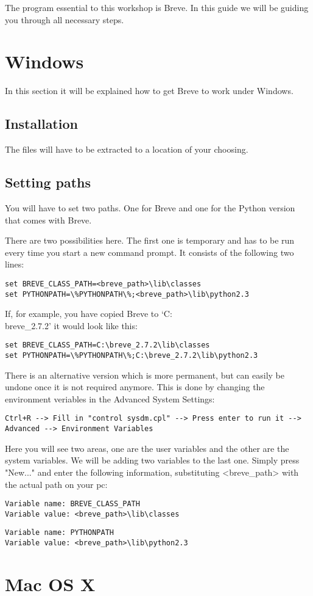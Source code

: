 The program essential to this workshop is Breve. In this guide we will be guiding you through all necessary steps. 

\section{Windows}
In this section it will be explained how to get Breve to work under Windows.
\subsection{Installation}
The files will have to be extracted to a location of your choosing. 

\subsection{Setting paths}
You will have to set two paths. One for Breve and one for the Python version that comes with Breve.

There are two possibilities here. The first one is temporary and has to be run every time you start a new command prompt. It consists of the following two lines:
\begin{lstlisting}
set BREVE_CLASS_PATH=<breve_path>\lib\classes
set PYTHONPATH=\%PYTHONPATH\%;<breve_path>\lib\python2.3
\end{lstlisting}
If, for example, you have copied Breve to `C:\\breve\_2.7.2' it would look like this:
\begin{lstlisting}
set BREVE_CLASS_PATH=C:\breve_2.7.2\lib\classes
set PYTHONPATH=\%PYTHONPATH\%;C:\breve_2.7.2\lib\python2.3
\end{lstlisting}

There is an alternative version which is more permanent, but can easily be undone once it is not required anymore. This is done by changing the environment veriables in the Advanced System Settings:
\begin{lstlisting}
Ctrl+R --> Fill in "control sysdm.cpl" --> Press enter to run it --> Advanced --> Environment Variables
\end{lstlisting}

Here you will see two areas, one are the user variables and the other are the system variables. We will be adding two variables to the last one. Simply press "New..." and enter the following information, substituting <breve\_path> with the actual path on your pc:
\begin{lstlisting}
Variable name: BREVE_CLASS_PATH
Variable value: <breve_path>\lib\classes
\end{lstlisting}
\begin{lstlisting}
Variable name: PYTHONPATH
Variable value: <breve_path>\lib\python2.3
\end{lstlisting}

\section{Mac OS X}